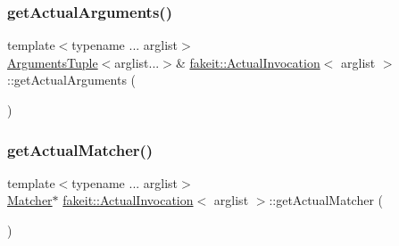 \mbox{\label{structfakeit_1_1ActualInvocation_a90b32ff4f76fa609de50d72792657207}} 
\subsubsection{\texorpdfstring{getActualArguments()}{getActualArguments()}\hspace{0.1cm}{\footnotesize\ttfamily [9/9]}}
{\footnotesize\ttfamily template$<$typename ... arglist$>$ \\
\mbox{\hyperlink{namespacefakeit_a476a37a598825e1b5dd67b3a176491a1}{Arguments\+Tuple}}$<$arglist...$>$\& \mbox{\hyperlink{structfakeit_1_1ActualInvocation}{fakeit\+::\+Actual\+Invocation}}$<$ arglist $>$\+::get\+Actual\+Arguments (\begin{DoxyParamCaption}{ }\end{DoxyParamCaption})\hspace{0.3cm}{\ttfamily [inline]}}

\mbox{\label{structfakeit_1_1ActualInvocation_a656047cd638d3617bf9038d30aa6808b}} 
\subsubsection{\texorpdfstring{getActualMatcher()}{getActualMatcher()}\hspace{0.1cm}{\footnotesize\ttfamily [1/9]}}
{\footnotesize\ttfamily template$<$typename ... arglist$>$ \\
\mbox{\hyperlink{structfakeit_1_1ActualInvocation_1_1Matcher}{Matcher}}$\ast$ \mbox{\hyperlink{structfakeit_1_1ActualInvocation}{fakeit\+::\+Actual\+Invocation}}$<$ arglist $>$\+::get\+Actual\+Matcher (\begin{DoxyParamCaption}{ }\end{DoxyParamCaption})\hspace{0.3cm}{\ttfamily [inline]}}

